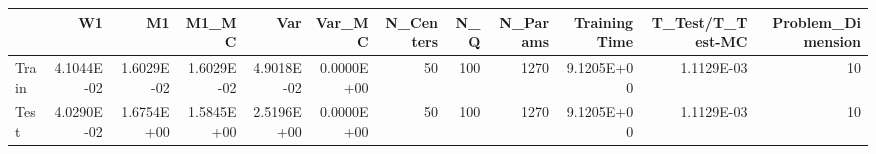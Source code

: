 \begin{tabular}{lrrrrrrrrrrr}
\toprule
{} &         W1 &         M1 &      M1\_MC &        Var &     Var\_MC &  N\_Centers &  N\_Q &  N\_Params &  Training Time &  T\_Test/T\_Test-MC &  Problem\_Dimension \\
\midrule
Train & 4.1044E-02 & 1.6029E-02 & 1.6029E-02 & 4.9018E-02 & 0.0000E+00 &         50 &  100 &      1270 &     9.1205E+00 &        1.1129E-03 &                 10 \\
Test  & 4.0290E-02 & 1.6754E+00 & 1.5845E+00 & 2.5196E+00 & 0.0000E+00 &         50 &  100 &      1270 &     9.1205E+00 &        1.1129E-03 &                 10 \\
\bottomrule
\end{tabular}
